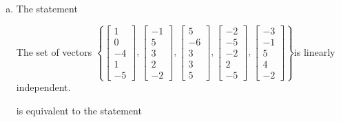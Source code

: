 \begin{exerciseAnswer}
\begin{enumerate}[(a)]
\item The statement 
\begin{center}\begin{minipage}{0.8\textwidth}
 The set of vectors \( \left\{ \left[\begin{array}{c}
1 \\
0 \\
-4 \\
1 \\
-5
\end{array}\right] , \left[\begin{array}{c}
-1 \\
5 \\
3 \\
2 \\
-2
\end{array}\right] , \left[\begin{array}{c}
5 \\
-6 \\
3 \\
3 \\
5
\end{array}\right] , \left[\begin{array}{c}
-2 \\
-5 \\
-2 \\
2 \\
-5
\end{array}\right] , \left[\begin{array}{c}
-3 \\
-1 \\
5 \\
4 \\
-2
\end{array}\right] \right\} \)is linearly independent.
\end{minipage}\end{center}
     is equivalent to the statement 
\begin{center}\begin{minipage}{0.8\textwidth}
 The vector equation \( x_{1} \left[\begin{array}{c}
1 \\
0 \\
-4 \\
1 \\
-5
\end{array}\right] + x_{2} \left[\begin{array}{c}
-1 \\
5 \\

\end{array}
\end{minipage}
\end{center}
\end{enumerate}
\end{exerciseAnswer}
